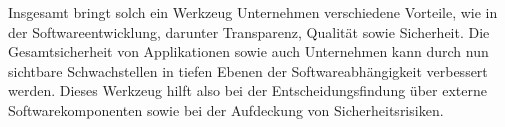     Insgesamt bringt solch ein Werkzeug Unternehmen verschiedene Vorteile, wie in der Softwareentwicklung, darunter Transparenz, Qualität sowie Sicherheit.
    Die Gesamtsicherheit von Applikationen sowie auch Unternehmen kann durch nun sichtbare Schwachstellen in tiefen Ebenen der Softwareabhängigkeit verbessert werden.
    Dieses Werkzeug hilft also bei der Entscheidungsfindung über externe Softwarekomponenten sowie bei der Aufdeckung von Sicherheitsrisiken.
    